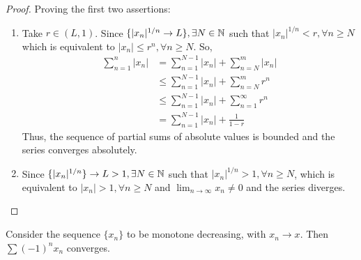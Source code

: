 \begin{proof}
    Proving the first two assertions:
    \begin{enumerate}
        \item Take $r \in (L, 1)$. Since $\{|x_n|^{1/n} \to L\}, \exists N \in \mathbb{N}$ such that $|x_n|^{1/n} < r, \forall n \geq N$ which is equivalent to $|x_n| \leq r^n, \forall n \geq N$. So,
        \begin{align*}
            \sum \limits_{n=1}^n|x_n| &= \sum \limits_{n=1}^{N-1}|x_n| + \sum \limits_{n=N}^{m}|x_n| \\
            &\leq \sum \limits_{n=1}^{N-1}|x_n| + \sum \limits_{n=N}^{m}r^n \\
            &\leq \sum \limits_{n=1}^{N-1}|x_n| + \sum \limits_{n=1}^{\infty}r^n \\
            &= \sum \limits_{n=1}^{N-1}|x_n| + \frac{1}{1-r}
        \end{align*}
        Thus, the sequence of partial sums of absolute values is bounded and the series converges absolutely.
        \item Since $\{|x_n|^{1/n}\} \to L > 1, \exists N \in \mathbb{N}$ such that $|x_n|^{1/n} > 1, \forall n \geq N$, which is equivalent to $|x_n| > 1, \forall n \geq N$ and $\lim_{n \to \infty} x_n \neq 0$ and the series diverges.
    \end{enumerate}
\end{proof}

\begin{theorem}
    Consider the sequence $\{x_n\}$ to be monotone decreasing, with $x_n \to x$. Then $\sum (-1)^n x_n$ converges.
\end{theorem}

